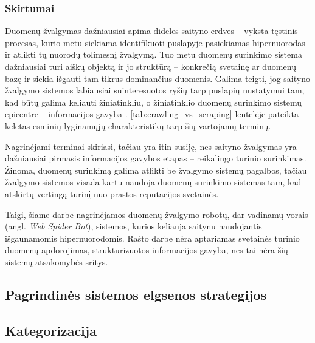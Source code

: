 \subsubsection{Skirtumai}

Duomenų žvalgymas dažniausiai apima dideles saityno erdves -- vyksta tęstinis procesas, kurio metu siekiama identifikuoti puslapyje pasiekiamas hipernuorodas ir atlikti tų nuorodų tolimesnį žvalgymą. Tuo metu duomenų surinkimo sistema dažniausiai turi aiškų objektą ir jo struktūrą -- konkrečią svetainę ar duomenų bazę ir siekia išgauti tam tikrus dominančius duomenis. Galima teigti, jog saityno žvalgymo sistemos labiausiai suinteresuotos ryšių tarp puslapių nustatymui tam, kad būtų galima keliauti žiniatinkliu, o žiniatinklio duomenų surinkimo sistemų epicentre -- informacijos gavyba \cite{OxylabsScrapingVsCrawling}. \ref{tab:crawling_vs_scraping} lentelėje pateikta keletas esminių lyginamųjų charakteristikų tarp šių vartojamų terminų.


Nagrinėjami terminai skiriasi, tačiau yra itin susiję, nes saityno žvalgymas yra dažniausiai pirmasis informacijos gavybos etapas -- reikalingo turinio surinkimas. Žinoma, duomenų surinkimą galima atlikti be žvalgymo sistemų pagalbos, tačiau žvalgymo sistemos visada kartu naudoja duomenų surinkimo sistemas tam, kad atskirtų vertingą turinį nuo prastos reputacijos svetainės. \cite{OxylabsScrapingVsCrawling}

Taigi, šiame darbe nagrinėjamos duomenų žvalgymo robotų, dar vadinamų vorais (angl. \textit{Web Spider Bot}), sistemos, kurios keliauja saitynu naudojantis išgaunamomis hipernuorodomis. Rašto darbe nėra aptariamas svetainės turinio duomenų apdorojimas, struktūrizuotos informacijos gavyba, nes tai nėra šių sistemų atsakomybės sritys.

\subsection{Pagrindinės sistemos elgsenos strategijos}
\subsection{Kategorizacija}